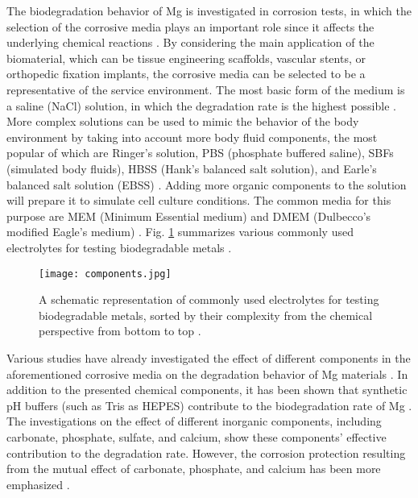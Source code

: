 The biodegradation behavior of Mg is investigated in corrosion tests, in which the selection of the corrosive media plays an important role since it affects the underlying chemical reactions \cite{Mei2020}. By considering the main application of the biomaterial, which can be tissue engineering scaffolds, vascular stents, or orthopedic fixation implants, the corrosive media can be selected to be a representative of the service environment. The most basic form of the medium is a saline (NaCl) solution, in which the degradation rate is the highest possible \cite{Mei2020}. More complex solutions can be used to mimic the behavior of the body environment by taking into account more body fluid components, the most popular of which are Ringer's solution, \gls{PBS} (phosphate buffered saline), \gls{SBF}s (simulated body fluids), \gls{HBSS} (Hank's balanced salt solution), and Earle's balanced salt solution (\gls{EBSS}) \cite{Mei2020}. Adding more organic components to the solution will prepare it to simulate cell culture conditions. The common media for this purpose are \gls{MEM} (Minimum Essential medium) and \gls{DMEM} (Dulbecco's modified Eagle's medium) \cite{Mei2020}. Fig. \ref{fig:components} summarizes various commonly used electrolytes for testing biodegradable metals \cite{Mei2020}.


\begin{figure}
\centering
\medskip
\texttt{[image: components.jpg]}
\caption[Commonly used electrolytes for testing biodegradable metals]{A schematic representation of commonly used electrolytes for testing biodegradable metals, sorted by their complexity from the chemical perspective from bottom to top \cite{Mei2020}.} 
\label{fig:components}
\end{figure}

Various studies have already investigated the effect of different components in the aforementioned corrosive media on the degradation behavior of Mg materials \cite{Mei2019,Zeng2014,Johnston2017, Lamaka2018,Mei2019a}. In addition to the presented chemical components, it has been shown that synthetic pH buffers (such as Tris as HEPES) contribute to the biodegradation rate of Mg \cite{Mei2019}. The investigations on the effect of different inorganic components, including carbonate, phosphate, sulfate, and calcium, show these components' effective contribution to the degradation rate. However, the corrosion protection resulting from the mutual effect of carbonate, phosphate, and calcium has been more emphasized \cite{Mei2019,Lamaka2018}.




